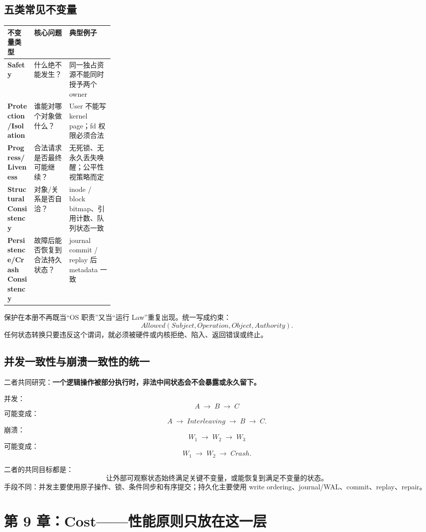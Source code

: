\documentclass[11pt,a4paper]{ctexart}
\newcommand{\kw}[1]{\textbf{#1}}
\newcommand{\arr}{\;\longrightarrow\;}
\begin{document}
\subsection{五类常见不变量}
\begin{center}
\scriptsize
\begin{tabularx}{\linewidth}{>{\bfseries}p{0.25\linewidth} Y Y}
\toprule
不变量类型 & 核心问题 & 典型例子 \\
\midrule
Safety & 什么绝不能发生？ & 同一独占资源不能同时授予两个 owner \\
Protection/Isolation & 谁能对哪个对象做什么？ & User 不能写 kernel page；fd 权限必须合法 \\
Progress/Liveness & 合法请求是否最终可能继续？ & 无死锁、无永久丢失唤醒；公平性视策略而定 \\
Structural Consistency & 对象/关系是否自洽？ & inode / block bitmap、引用计数、队列状态一致 \\
Persistence/Crash Consistency & 故障后能否恢复到合法持久状态？ & journal commit / replay 后 metadata 一致 \\
\bottomrule
\end{tabularx}
\end{center}

\begin{corebox}
保护在本册不再既当“OS 职责”又当“运行 Law”重复出现。统一写成约束：
\[
\boxed{Allowed(Subject,Operation,Object,Authority)}.
\]
任何状态转换只要违反这个谓词，就必须被硬件或内核拒绝、陷入、返回错误或终止。
\end{corebox}

\subsection{并发一致性与崩溃一致性的统一}
二者共同研究：\kw{一个逻辑操作被部分执行时，非法中间状态会不会暴露或永久留下。}

并发：
\[
A\arr B\arr C
\]
可能变成：
\[
A\arr\boxed{Interleaving}\arr B\arr C.
\]
崩溃：
\[
W_1\arr W_2\arr W_3
\]
可能变成：
\[
W_1\arr W_2\arr\boxed{Crash}.
\]

二者的共同目标都是：
\[
\boxed{\text{让外部可观察状态始终满足关键不变量，或能恢复到满足不变量的状态。}}
\]
手段不同：并发主要使用原子操作、锁、条件同步和有序提交；持久化主要使用 write ordering、journal/WAL、commit、replay、repair。

\section{第 9 章：Cost——性能原则只放在这一层}
\end{document}
